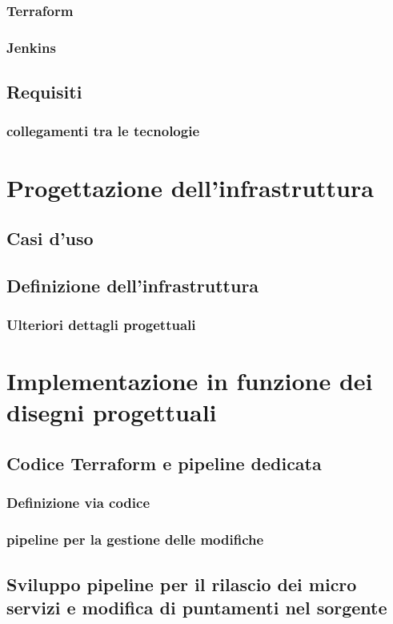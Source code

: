 \documentclass[a4paper,12pt]{report}
\begin{document}
\subsection{Terraform}
\subsection{Jenkins}
\section{Requisiti}
\subsection{collegamenti tra le tecnologie}

\chapter{Progettazione dell'infrastruttura}
\section{Casi d'uso}
\section{Definizione dell'infrastruttura}
\subsection{Ulteriori dettagli progettuali}

\chapter{Implementazione in funzione dei disegni progettuali}
\section{Codice Terraform e pipeline dedicata}
\subsection{Definizione via codice}
\subsection{pipeline per la gestione delle modifiche}
\section{Sviluppo pipeline per il rilascio dei micro servizi e modifica di puntamenti nel sorgente}
\end{document}
